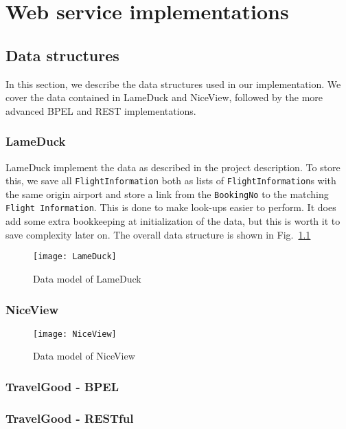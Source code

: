 {\setlength{\chapterfontsize}{23pt}
\chapter{Web service implementations}
}

\section{Data structures}
In this section, we describe the data structures used in our implementation. We cover the data contained in LameDuck and NiceView, followed by the more advanced BPEL and REST implementations.

\subsection{LameDuck}
LameDuck implement the data as described in the project description. To store this, we save all \texttt{FlightInformation} both as lists of \texttt{FlightInformation}s with the same origin airport and store a link from the \texttt{BookingNo} to the matching \texttt{Flight Information}. This is done to make look-ups easier to perform. It does add some extra bookkeeping at initialization of the data, but this is worth it to save complexity later on. The overall data structure is shown in Fig.~\ref{fig:lameduck_class}

\begin{figure}[H]
\centering
\texttt{[image: LameDuck]}
\caption{Data model of LameDuck}
\label{fig:lameduck_class}
\end{figure}


\subsection{NiceView}
\begin{figure}[H]
\centering
\texttt{[image: NiceView]}
\caption{Data model of NiceView}
\label{fig:niceview_class}
\end{figure}

\subsection{TravelGood - BPEL}

\subsection{TravelGood - RESTful}
